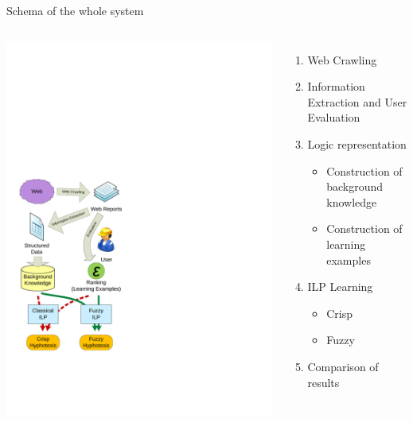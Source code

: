 \documentclass[xcolor=dvipsnames]{beamer}
\begin{document}
\begin{frame}{Schema of the whole system}
\begin{columns}
\includegraphics[height=0.9\vsize]{img/fuzzy_schema}
\begin{enumerate}
	\item Web Crawling
	\item Information Extraction and User Evaluation
	\item Logic representation
		\begin{itemize}
			\item Construction of \alert{background knowledge}
			\item Construction of \alert{learning examples}
		\end{itemize}
	\item ILP Learning
		\begin{itemize}
			\item Crisp
			\item Fuzzy
		\end{itemize}
		
	\bigskip
	\item Comparison of results
\end{enumerate}
\end{columns}
\end{frame}
\end{document}

